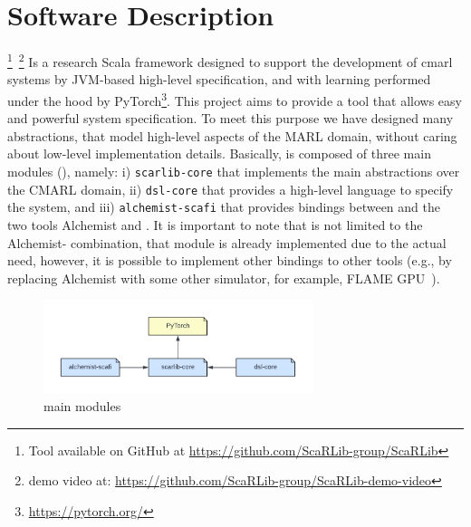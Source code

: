 \section{Software Description}\label{coordination2023:contribution}

\scarlib{} \footnote{Tool available on GitHub at \url{https://github.com/ScaRLib-group/ScaRLib}}~\footnote{demo video at: \url{https://github.com/ScaRLib-group/ScaRLib-demo-video}} Is a research Scala framework designed to support
the development of \ac{cmarl} systems by JVM-based high-level specification, and with learning performed under the hood by PyTorch\footnote{\url{https://pytorch.org/}}.
%
This project aims to provide a tool that allows easy and powerful system specification.
%
To meet this purpose we have designed many abstractions, that model high-level aspects of the MARL domain, 
 without caring about low-level implementation details.
Basically, \scarlib{} is composed of three main modules (), namely: 
    i) \texttt{scarlib-core} that implements the main abstractions over the CMARL domain,
    ii) \texttt{dsl-core} that provides a high-level language to specify the system, and
    iii) \texttt{alchemist-scafi} that provides bindings between \scarlib{} and the two tools Alchemist and \scafi{}.
    It is important to note that \scarlib{} is not limited to the Alchemist-\scafi{} combination, that module is 
    already implemented due to the actual need, however, it is possible to implement other bindings to other tools
    (e.g., by replacing Alchemist with some other simulator, for example, FLAME GPU~\cite{flame}).
\begin{figure}[t]
    \centering
    \includegraphics[width=0.7\textwidth]{papers/coordination2023/imgs/scarlib-modules.pdf}
    \caption{\scarlib{} main modules}
    \label{coordination2023:fig:modules}
\end{figure}

